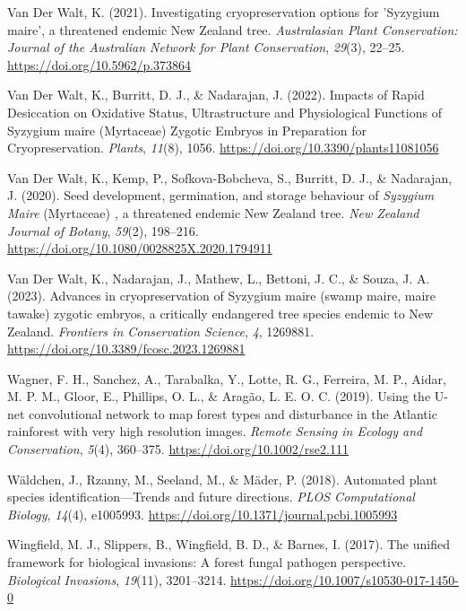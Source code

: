 \documentclass[
]{scrreprt}
\newlength{\cslhangindent}
\newenvironment{CSLReferences}[2] %
 {\begin{list}{}{%
  \setlength{\itemindent}{0pt}
  \setlength{\leftmargin}{0pt}
  \setlength{\parsep}{0pt}
  \setlength{\baselineskip}{12pt}
  \ifodd #1
   \setlength{\leftmargin}{\cslhangindent}
   \setlength{\itemindent}{-1\cslhangindent}
  \fi
  \setlength{\itemsep}{4pt}}}
 {\end{list}}
\begin{document}
\begin{CSLReferences}{1}{0}
Van Der Walt, K. (2021). Investigating cryopreservation options for
'{Syzygium} maire', a threatened endemic {New Zealand} tree.
\emph{Australasian Plant Conservation: Journal of the Australian Network
for Plant Conservation}, \emph{29}(3), 22--25.
\url{https://doi.org/10.5962/p.373864}

Van Der Walt, K., Burritt, D. J., \& Nadarajan, J. (2022). Impacts of
{Rapid Desiccation} on {Oxidative Status}, {Ultrastructure} and
{Physiological Functions} of {Syzygium} maire ({Myrtaceae}) {Zygotic
Embryos} in {Preparation} for {Cryopreservation}. \emph{Plants},
\emph{11}(8), 1056. \url{https://doi.org/10.3390/plants11081056}

Van Der Walt, K., Kemp, P., Sofkova-Bobcheva, S., Burritt, D. J., \&
Nadarajan, J. (2020). Seed development, germination, and storage
behaviour of {\emph{Syzygium}}{ \emph{Maire}} ({Myrtaceae}) {\emph{,}} a
threatened endemic {New Zealand} tree. \emph{New Zealand Journal of
Botany}, \emph{59}(2), 198--216.
\url{https://doi.org/10.1080/0028825X.2020.1794911}

Van Der Walt, K., Nadarajan, J., Mathew, L., Bettoni, J. C., \& Souza,
J. A. (2023). Advances in cryopreservation of {Syzygium} maire (swamp
maire, maire tawake) zygotic embryos, a critically endangered tree
species endemic to {New Zealand}. \emph{Frontiers in Conservation
Science}, \emph{4}, 1269881.
\url{https://doi.org/10.3389/fcosc.2023.1269881}

Wagner, F. H., Sanchez, A., Tarabalka, Y., Lotte, R. G., Ferreira, M.
P., Aidar, M. P. M., Gloor, E., Phillips, O. L., \& Aragão, L. E. O. C.
(2019). Using the {U}-net convolutional network to map forest types and
disturbance in the {Atlantic} rainforest with very high resolution
images. \emph{Remote Sensing in Ecology and Conservation}, \emph{5}(4),
360--375. \url{https://doi.org/10.1002/rse2.111}

Wäldchen, J., Rzanny, M., Seeland, M., \& Mäder, P. (2018). Automated
plant species identification---{Trends} and future directions.
\emph{PLOS Computational Biology}, \emph{14}(4), e1005993.
\url{https://doi.org/10.1371/journal.pcbi.1005993}

Wingfield, M. J., Slippers, B., Wingfield, B. D., \& Barnes, I. (2017).
The unified framework for biological invasions: A forest fungal pathogen
perspective. \emph{Biological Invasions}, \emph{19}(11), 3201--3214.
\url{https://doi.org/10.1007/s10530-017-1450-0}


\end{CSLReferences}
\end{document}

